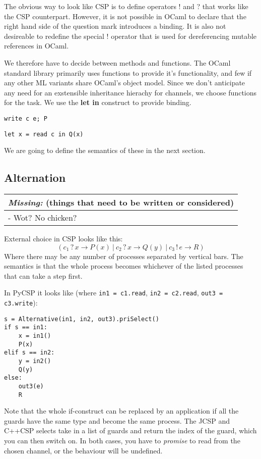 \documentclass[a4paper,12pt]{article}
\newcommand{\missing}[1]{
\begin{tabular}{|p{11cm}|}
\hline
\emph{Missing:} {\scriptsize (things that need to be written or considered)} \\
\hline
#1
\hline
\end{tabular}
}
\begin{document}
The obvious way to look like CSP is to define operators ! and ? that works like the
CSP counterpart. However, it is not possible in OCaml to declare that the right hand 
side of the question mark introduces a binding. It is also not desireable to redefine
the special ! operator that is used for dereferencing mutable references in OCaml.

We therefore have to decide between methods and functions. The OCaml standard library
primarily uses functions to provide it's functionality, and few if any other ML 
variants share OCaml's object model. Since we don't anticipate any need for an
exstensible inheritance hierachy for channels, we choose functions for the task.
We use the \textbf{let in} construct to provide binding.

\begin{verbatim}
write c e; P
\end{verbatim}
\begin{verbatim}
let x = read c in Q(x)
\end{verbatim}

We are going to define the semantics of these in the next section.

\subsection{Alternation}
\missing{
- Wot? No chicken?\\
}

External choice in CSP looks like this:
\[(c_1\,?\,x \to P(x)\ |\ c_2\,?\,x \to Q(y)\ |\ c_3\,!\,e \to R)\]
Where there may be any number of processes separated by vertical bars.
The semantics is that the whole process becomes whichever of the listed processes 
that can take a step first. 

In PyCSP it looks like (where \texttt{in1 = c1.read}, \texttt{in2 = c2.read}, \texttt{out3 = c3.write}):
\begin{verbatim}
s = Alternative(in1, in2, out3).priSelect()
if s == in1:
    x = in1()
    P(x)
elif s == in2:
    y = in2()
    Q(y)
else:
    out3(e)
    R
\end{verbatim}

Note that the whole if-construct can be replaced by an application if all the guards have the same type 
and become the same process. The JCSP and C++CSP selects take in a list of guards and return the index
of the guard, which you can then switch on. In both cases, you have to \emph{promise} to read from the
chosen channel, or the behaviour will be undefined.
\end{document}
